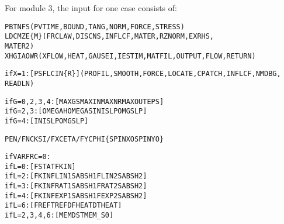 \documentclass[12pt]{report}
\renewcommand{\magenta}[1]{}
\begin{document}
For module 3, the input for one case consists of:
\begin{alltt}\small
% Control integers, see section \ref{sec:controldigits}:

  PBTNFS                     (PVTIME, BOUND , TANG  , NORM  , FORCE , STRESS)
  LDCMZE  \{M\}                (FRCLAW, DISCNS, INFLCF, MATER , RZNORM, EXRHS ,
                                                                      MATER2)
XHGIAOWR     (XFLOW , HEAT  , GAUSEI, IESTIM, MATFIL, OUTPUT, FLOW  , RETURN)

% Parameters for additional debug output

if X=1: [ PSFLCIN \{R\} ] (PROFIL, SMOOTH, FORCE, LOCATE, CPATCH, INFLCF, NMDBG,
                                                                        READLN)

% Parameters for the iterative solution algorithms (section \ref{sec:iter_const}):

if G=0,2,3,4: [ MAXGS   MAXIN   MAXNR   MAXOUT  EPS     ]
if G=2,3:     [ OMEGAH  OMEGAS  INISLP  OMGSLP          ]
if G=4:       [ INISLP  OMGSLP                          ]
\magenta{if G=5:       [ FDECAY  BETATH  KDOWFB  D\_IFC   D\_LIN   D\_CNS   D\_SLP   POW\_S ]
}
% Kinematics description (section \ref{sec:kincns}):
% Note: PEN  is needed when N=0,      FN when N=1
%       CKSI is needed when F=0,      FX when F=1 or 2
%       CETA is needed when F=0 or 1, FY when F=2

PEN/FN  CKSI/FX  CETA/FY  CPHI   \{SPINXO   SPINYO\}

% Friction description (section \ref{sec:fric_dscrp}):
%      L=0 --> Coulomb friction with static/kinetic coefficients
%      L=2 --> velocity dependent friction with linear/const formula
%      L=3 --> velocity dependent friction with rational formula
%      L=4 --> velocity dependent friction with exponential formula
%      L=6 --> temperature dependent friction with piecewise linear formula

if VARFRC=0:
      if L=0: [ FSTAT  FKIN                                ]
      if L=2: [ FKIN   FLIN1  SABSH1  FLIN2  SABSH2        ]
      if L=3: [ FKIN   FRAT1  SABSH1  FRAT2  SABSH2        ]
      if L=4: [ FKIN   FEXP1  SABSH1  FEXP2  SABSH2        ]
      if L=6: [ FREF   TREF   DFHEAT  DTHEAT               ]
if L=2,3,4,6: [ MEMDST MEM\_S0                              ]

% Information needed for influence coefficients,
% particularly the rolling direction and step size (section \ref{sec:kincns}),
% and the geometry/material configuration (section \ref{sec:matcns}):


\end{alltt}
\end{document}
